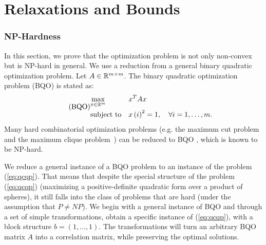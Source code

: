 %
\chapter{Relaxations and Bounds}\label{chap:relaxations}


\subsection{NP-Hardness}\label{subsec:nphard}
In this section, we prove that the optimization problem is not only
non-convex but is NP-hard in general. We use a reduction from a general binary quadratic
optimization problem.
%
%
Let $A   \in \mathbb{R}^{m\times m}$.  %
The binary quadratic optimization problem (BQO) is stated as:
\begin{equation}\label{eq:binqp}
\tag{BQO}
\begin{aligned}
& \underset{x \in \mathbb{R}^m}{\text{max}}
& & x^T A x  \\
& \text{subject to}
& & x\left(i\right)^2 = 1,  \quad\forall i =1,\ldots,m.\\
\end{aligned}
\end{equation}
Many hard combinatorial optimization problems (e.g. the
maximum cut  problem and the maximum clique problem~\cite{Garey:1990:CIG:574848}) can be reduced to
BQO \cite{Goemans95improvedapproximation}, which is known to be NP-hard.


We reduce a general instance of a  BQO problem to an
instance of the problem (\ref{eq:qcqp}). That means that despite the special
structure of the
problem (\ref{eq:qcqp}) (maximizing a positive-definite quadratic form over a
product of spheres), it still falls into the class of problems that are hard (under the assumption that $P \neq NP$).
We begin with a general instance of BQO and through a set of simple transformations, obtain a specific
instance of (\ref{eq:qcqp}), with a block structure $b =
\left(1,\ldots,1\right)$. The transformations will turn an arbitrary
BQO matrix $A$ into a correlation matrix, while preserving  the optimal solutions.


